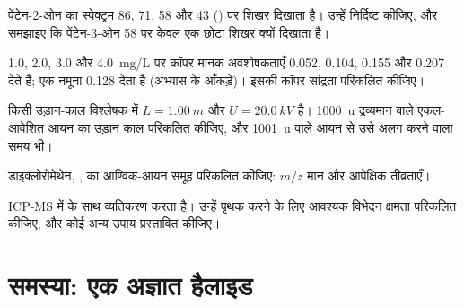 \begin{exercise}[$\star\star$]\label{exo:b2:mass-spec-atomic:8}
पेंटेन-2-ओन का स्पेक्ट्रम 86, 71, 58 और 43 () पर शिखर दिखाता है। उन्हें निर्दिष्ट कीजिए, और समझाइए
कि पेंटेन-3-ओन 58 पर केवल एक छोटा शिखर क्यों दिखाता है।
\end{exercise}

\begin{exercise}[$\star\star$]\label{exo:b2:mass-spec-atomic:9}
1.0, 2.0, 3.0 और \qty{4.0}{mg/L} पर कॉपर मानक अवशोषकताएँ 0.052, 0.104, 0.155 और 0.207 देते हैं;
एक नमूना 0.128 देता है (अभ्यास के आँकड़े)। इसकी कॉपर सांद्रता परिकलित कीजिए।
\end{exercise}

\begin{exercise}[$\star\star\star$]\label{exo:b2:mass-spec-atomic:10}
किसी उड़ान-काल विश्लेषक में $L = \qty{1.00}{m}$ और $U = \qty{20.0}{kV}$ है। \qty{1000}{u} द्रव्यमान वाले
एकल-आवेशित आयन का उड़ान काल परिकलित कीजिए, और \qty{1001}{u} वाले आयन से उसे अलग करने वाला समय भी।
\end{exercise}

\begin{exercise}[$\star\star\star$]\label{exo:b2:mass-spec-atomic:11}
डाइक्लोरोमेथेन, , का आण्विक-आयन समूह परिकलित कीजिए: $m/z$ मान और आपेक्षिक
तीव्रताएँ।
\end{exercise}

\begin{exercise}[$\star\star\star$]\label{exo:b2:mass-spec-atomic:12}
ICP-MS में   के साथ व्यतिकरण करता है। उन्हें पृथक करने के लिए आवश्यक विभेदन क्षमता परिकलित कीजिए,
और कोई अन्य उपाय प्रस्तावित कीजिए।
\end{exercise}

\section{समस्या: एक अज्ञात हैलाइड}

